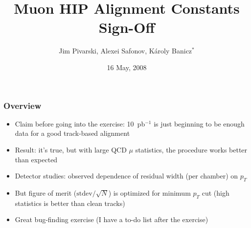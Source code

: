 \documentclass[compress]{beamer}
\title{Muon HIP Alignment Constants Sign-Off}
\author{Jim Pivarski, Alexei Safonov, K\'aroly Banicz$^*$}
\institute{Texas A\&M University, $^*$FermiLab}
\date{16 May, 2008}
\begin{document}
\frame{\titlepage}


\begin{frame}
\frametitle{Overview}

\begin{itemize}\setlength{\itemsep}{0.3 cm}
\item Claim before going into the exercise: 10~pb$^{-1}$ is just beginning to be enough data for a good track-based alignment
\item Result: it's true, but with large QCD $\mu$ statistics, the procedure works better than expected
\item Detector studies: observed dependence of residual width (per chamber) on $p_T$
\item But figure of merit ($\mbox{stdev}/\sqrt{N}$) is optimized for minimum $p_T$ cut (high statistics is better than clean tracks)
\item Great bug-finding exercise (I have a to-do list after the exercise)
\end{itemize}

\end{frame}
\end{document}
